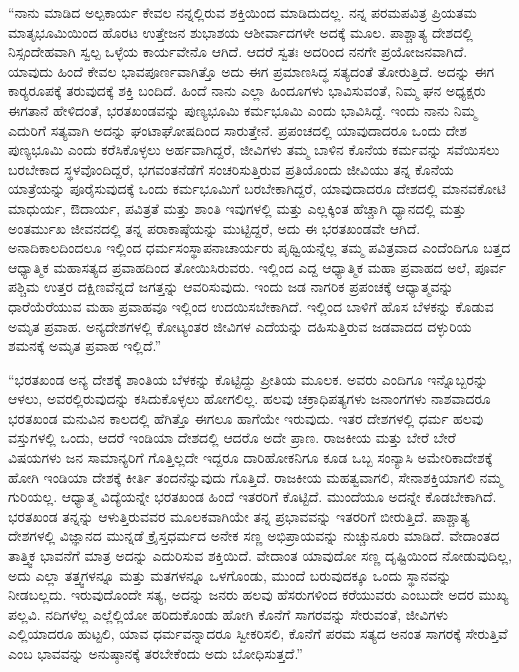  “ನಾನು ಮಾಡಿದ ಅಲ್ಪಕಾರ್ಯ ಕೇವಲ ನನ್ನಲ್ಲಿರುವ ಶಕ್ತಿಯಿಂದ ಮಾಡಿದುದಲ್ಲ. ನನ್ನ ಪರಮಪವಿತ್ರ ಪ್ರಿಯತಮ ಮಾತೃಭೂಮಿಯಿಂದ ಹೊರಟ ಉತ್ತೇಜನ ಶುಭಾಶಯ ಆಶೀರ್ವಾದಗಳೇ ಅದಕ್ಕೆ ಮೂಲ. ಪಾಶ್ಚಾತ್ಯ ದೇಶದಲ್ಲಿ ನಿಸ್ಸಂದೇಹವಾಗಿ ಸ್ವಲ್ಪ ಒಳ್ಳೆಯ ಕಾರ್ಯವೇನೊ ಆಗಿದೆ. ಆದರೆ ಸ್ವತಃ ಅದರಿಂದ ನನಗೇ ಪ್ರಯೋಜನವಾಗಿದೆ. ಯಾವುದು ಹಿಂದೆ ಕೇವಲ ಭಾವಪೂರ್ಣವಾಗಿತ್ತೊ ಅದು ಈಗ ಪ್ರಮಾಣಸಿದ್ಧ ಸತ್ಯದಂತೆ ತೋರುತ್ತಿದೆ. ಅದನ್ನು ಈಗ ಕಾರ‍್ಯ‍ರೂಪಕ್ಕೆ ತರುವುದಕ್ಕೆ ಶಕ್ತಿ ಬಂದಿದೆ. ಹಿಂದೆ ನಾನು ಎಲ್ಲಾ ಹಿಂದೂಗಳು ಭಾವಿಸುವಂತೆ, ನಿಮ್ಮ ಘನ ಅಧ್ಯಕ್ಷರು ಈಗತಾನೆ ಹೇಳಿದಂತೆ, ಭರತಖಂಡವನ್ನು ಪುಣ್ಯಭೂಮಿ ಕರ್ಮಭೂಮಿ ಎಂದು ಭಾವಿಸಿದ್ದೆ. ಇಂದು ನಾನು ನಿಮ್ಮ ಎದುರಿಗೆ ಸತ್ಯವಾಗಿ ಅದನ್ನು ಘಂಟಾಘೋಷದಿಂದ ಸಾರುತ್ತೇನೆ. ಪ್ರಪಂಚದಲ್ಲಿ ಯಾವುದಾದರೂ ಒಂದು ದೇಶ ಪುಣ್ಯಭೂಮಿ ಎಂದು ಕರೆಸಿಕೊಳ್ಳಲು ಅರ್ಹವಾಗಿದ್ದರೆ, ಜೀವಿಗಳು ತಮ್ಮ ಬಾಳಿನ ಕೊನೆಯ ಕರ್ಮವನ್ನು ಸವೆಯಿಸಲು ಬರಬೇಕಾದ ಸ್ಥಳವೊಂದಿದ್ದರೆ, ಭಗವಂತನೆಡೆಗೆ ಸಂಚರಿಸುತ್ತಿರುವ ಪ್ರತಿಯೊಂದು ಜೀವಿಯು ತನ್ನ ಕೊನೆಯ ಯಾತ್ರೆಯನ್ನು ಪೂರೈಸುವುದಕ್ಕೆ ಒಂದು ಕರ್ಮಭೂಮಿಗೆ ಬರಬೇಕಾಗಿದ್ದರೆ, ಯಾವುದಾದರೂ ದೇಶದಲ್ಲಿ ಮಾನವಕೋಟಿ ಮಾಧುರ್ಯ, ಔದಾರ್ಯ, ಪವಿತ್ರತೆ ಮತ್ತು ಶಾಂತಿ ಇವುಗಳಲ್ಲಿ ಮತ್ತು ಎಲ್ಲಕ್ಕಿಂತ ಹೆಚ್ಚಾಗಿ ಧ್ಯಾನದಲ್ಲಿ ಮತ್ತು ಅಂತರ್ಮುಖ ಜೀವನದಲ್ಲಿ ತನ್ನ ಪರಾಕಾಷ್ಠೆಯನ್ನು ಮುಟ್ಟಿದ್ದರೆ, ಅದು ಈ ಭರತಖಂಡವೇ ಆಗಿದೆ. ಅನಾದಿಕಾಲದಿಂದಲೂ ಇಲ್ಲಿಂದ ಧರ್ಮಸಂಸ್ಥಾಪನಾಚಾರ್ಯರು ಪೃಥ್ವಿಯನ್ನೆಲ್ಲ ತಮ್ಮ ಪವಿತ್ರವಾದ ಎಂದೆಂದಿಗೂ ಬತ್ತದ ಆಧ್ಯಾತ್ಮಿಕ ಮಹಾಸತ್ಯದ ಪ್ರವಾಹದಿಂದ ತೋಯಿಸಿರುವರು. ಇಲ್ಲಿಂದ ಎದ್ದ ಆಧ್ಯಾತ್ಮಿಕ ಮಹಾ ಪ್ರವಾಹದ ಅಲೆ, ಪೂರ್ವ ಪಶ್ಚಿಮ ಉತ್ತರ ದಕ್ಷಿಣವೆನ್ನದೆ ಜಗತ್ತನ್ನು ಆವರಿಸುವುದು. ಇಂದು ಜಡ ನಾಗರಿಕ ಪ್ರಪಂಚಕ್ಕೆ ಆಧ್ಯಾತ್ಮವನ್ನು ಧಾರೆಯೆರೆಯುವ ಮಹಾ ಪ್ರವಾಹವೂ ಇಲ್ಲಿಂದ ಉದಯಿಸಬೇಕಾಗಿದೆ. ಇಲ್ಲಿಂದ ಬಾಳಿಗೆ ಹೊಸ ಬೆಳಕನ್ನು ಕೊಡುವ ಅಮೃತ ಪ್ರವಾಹ. ಅನ್ಯದೇಶಗಳಲ್ಲಿ ಕೋಟ್ಯಂತರ ಜೀವಿಗಳ ಎದೆಯನ್ನು ದಹಿಸುತ್ತಿರುವ ಜಡವಾದದ ದಳ್ಳುರಿಯ ಶಮನಕ್ಕೆ ಅಮೃತ ಪ್ರವಾಹ ಇಲ್ಲಿದೆ.” 

 “ಭರತಖಂಡ ಅನ್ಯ ದೇಶಕ್ಕೆ ಶಾಂತಿಯ ಬೆಳಕನ್ನು ಕೊಟ್ಟಿದ್ದು ಪ್ರೀತಿಯ ಮೂಲಕ. ಅವರು ಎಂದಿಗೂ ಇನ್ನೊಬ್ಬರನ್ನು ಆಳಲು, ಅವರಲ್ಲಿರುವುದನ್ನು ಕಸಿದುಕೊಳ್ಳಲು ಹೋಗಲಿಲ್ಲ. ಹಲವು ಚಕ್ರಾಧಿಪತ್ಯಗಳು ಜನಾಂಗಗಳು ನಾಶವಾದರೂ ಭರತಖಂಡ ಮನುವಿನ ಕಾಲದಲ್ಲಿ ಹೆಗಿತ್ತೊ ಈಗಲೂ ಹಾಗೆಯೇ ಇರುವುದು. ಇತರ ದೇಶಗಳಲ್ಲಿ ಧರ್ಮ ಹಲವು ವಸ್ತುಗಳಲ್ಲಿ ಒಂದು, ಆದರೆ ಇಂಡಿಯಾ ದೇಶದಲ್ಲಿ ಆದರೊ ಅದೇ ಪ್ರಾಣ. ರಾಜಕೀಯ ಮತ್ತು ಬೇರೆ ಬೇರೆ ವಿಷಯಗಳು ಜನ ಸಾಮಾನ್ಯರಿಗೆ ಗೊತ್ತಿಲ್ಲದೇ ಇದ್ದರೂ ದಾರಿಹೋಕನಿಗೂ ಕೂಡ ಒಬ್ಬ ಸಂನ್ಯಾಸಿ ಅಮೇರಿಕಾದೇಶಕ್ಕೆ ಹೋಗಿ ಇಂಡಿಯಾ ದೇಶಕ್ಕೆ ಕೀರ್ತಿ ತಂದನೆನ್ನುವುದು ಗೊತ್ತಿದೆ. ರಾಜಕೀಯ ಮಹತ್ವವಾಗಲಿ, ಸೇನಾಶಕ್ತಿಯಾಗಲಿ ನಮ್ಮ ಗುರಿಯಲ್ಲ. ಆಧ್ಯಾತ್ಮ ವಿದ್ಯೆಯನ್ನೇ ಭರತಖಂಡ ಹಿಂದೆ ಇತರರಿಗೆ ಕೊಟ್ಟಿದೆ. ಮುಂದೆಯೂ ಅದನ್ನೇ ಕೊಡಬೇಕಾಗಿದೆ. ಭರತಖಂಡ ತನ್ನನ್ನು ಆಳುತ್ತಿರುವವರ ಮೂಲಕವಾಗಿಯೇ ತನ್ನ ಪ್ರಭಾವವನ್ನು ಇತರರಿಗೆ ಬೀರುತ್ತಿದೆ. ಪಾಶ್ಚಾತ್ಯ ದೇಶಗಳಲ್ಲಿ ವಿಜ್ಞಾನದ ಮುನ್ನಡೆ ಕ್ರೈಸ್ತಧರ್ಮದ ಅನೇಕ ಸಣ್ಣ ಅಭಿಪ್ರಾಯವನ್ನು ನುಚ್ಚುನೂರು ಮಾಡಿದೆ. ವೇದಾಂತದ ತಾತ್ತ್ವಿಕ ಭಾವನೆಗೆ ಮಾತ್ರ ಅದನ್ನು ಎದುರಿಸುವ ಶಕ್ತಿಯಿದೆ. ವೇದಾಂತ ಯಾವುದೋ ಸಣ್ಣ ದೃಷ್ಟಿಯಿಂದ ನೋಡುವುದಿಲ್ಲ, ಅದು ಎಲ್ಲಾ ತತ್ತ್ವಗಳನ್ನೂ ಮತ್ತು ಮತಗಳನ್ನೂ ಒಳಗೊಂಡು, ಮುಂದೆ ಬರುವುದಕ್ಕೂ ಒಂದು ಸ್ಥಾನವನ್ನು ನೀಡಬಲ್ಲದು. ಇರುವುದೊಂದೇ ಸತ್ಯ, ಅದನ್ನು ಜನರು ಹಲವು ಹೆಸರುಗಳಿಂದ ಕರೆಯುವರು ಎಂಬುದೇ ಅದರ ಮುಖ್ಯ ಪಲ್ಲವಿ. ನದಿಗಳೆಲ್ಲ ಎಲ್ಲೆಲ್ಲಿಯೋ ಹರಿದುಕೊಂಡು ಹೋಗಿ ಕೊನೆಗೆ ಸಾಗರವನ್ನು ಸೇರುವಂತೆ, ಜೀವಿಗಳು ಎಲ್ಲಿಯಾದರೂ ಹುಟ್ಟಲಿ, ಯಾವ ಧರ್ಮವನ್ನಾದರೂ ಸ್ವೀಕರಿಸಲಿ, ಕೊನೆಗೆ ಪರಮ ಸತ್ಯದ ಅನಂತ ಸಾಗರಕ್ಕೆ ಸೇರುತ್ತಿವೆ ಎಂಬ ಭಾವವನ್ನು ಅನುಷ್ಠಾನಕ್ಕೆ ತರಬೇಕೆಂದು ಅದು ಬೋಧಿಸುತ್ತದೆ.” 

